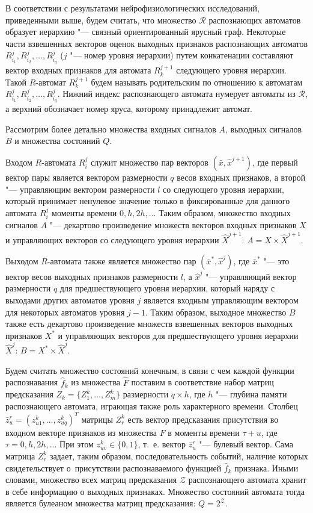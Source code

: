 \documentclass[a4paper, 12pt]{article}
\numberwithin{equation}{section}
\begin{document}
	В соответствии с результатами нейрофизиологических исследований, приведенными выше, будем считать, что множество  $\mathcal R$ распознающих автоматов образует иерархию "--- связный ориентированный ярусный граф. Некоторые части взвешенных векторов оценок выходных признаков распознающих автоматов $R_{i_1}^j,R_{i_2}^j,\dots,R_{i_q}^j$ ($j$ "--- номер уровня иерархии) путем конкатенации составляют вектор входных признаков для  автомата $R_k^{j+1}$ следующего уровня иерархии. Такой $R$-автомат $R_k^{j+1}$ будем называть родительским по отношению к автоматам $R_{i_1}^j,R_{i_2}^j,\dots,R_{i_q}^j$. Нижний индекс распознающего автомата нумерует автоматы из $\mathcal R$, а верхний обозначает номер яруса, которому принадлежит автомат.
		
	Рассмотрим более детально множества входных сигналов $A$, выходных сигналов $B$ и множества состояний $Q$.
	
	Входом $R$-автомата $R_i^j$ служит множество пар векторов $(\bar x,\hat x^{j+1})$, где первый вектор пары является вектором размерности $q$ весов входных признаков, а второй "--- управляющим вектором размерности $l$ со следующего уровня иерархии, который принимает ненулевое значение только в фиксированные для данного автомата $R_i^j$ моменты времени $0,h,2h,\dots$ Таким образом, множество входных сигналов $A$ "--- декартово произведение множеств векторов входных признаков $X$ и управляющих векторов со следующего уровня иерархии $\hat X^{j+1}$: $A=X\times \hat X^{j+1}$. 
	
	Выходом $R$-автомата также является множество пар $(\bar x^*,\hat x^j)$, где $\bar x^*$ "--- это вектор весов выходных признаков размерности $l$, а $\hat x^j$ "--- управляющий вектор размерности $q$ для предшествующего уровня иерархии, который наряду с выходами других автоматов уровня $j$ является входным управляющим вектором для некоторых автоматов уровня $j-1$. Таким образом, выходное множество $B$ также есть декартово произведение множеств взвешенных векторов выходных признаков $X^*$ и управляющих векторов для предшествующего уровня иерархии $\hat X^j$: $B=X^*\times \hat X^j$.
	
	Будем считать множество состояний конечным, в связи с чем каждой функции распознавания $\hat f_k$ из множества $\hat F$ поставим в соответствие набор матриц предсказания $Z_k=\{Z_1^k,…,Z_m^k\}$ размерности $q\times h$, где $h$ "--- глубина памяти распознающего автомата, играющая также роль характерного времени. Столбец $\bar{z}_u^r=(z_{u1}^k,…,z_{uq}^k)^T$ матрицы $Z_r^k$ есть вектор предсказания присутствия во входном векторе признаков из множества $F$ в моменты времени $\tau+u$, где $\tau = 0,h,2h,\dots$ При этом $z_{uv}^k\in\{0,1\}$, т.~е. вектор $\bar{z}_u^r$ "--- булевый вектор. Сама матрица $Z_r^k$ задает, таким образом, последовательность событий, наличие которых свидетельствует о~присутствии распознаваемого функцией $\hat f_k$ признака. Иными словами, множество всех матриц предсказания $\mathcal Z$ распознающего автомата хранит в себе информацию о выходных признаках. Множество состояний автомата тогда является булеаном множества матриц предсказания: $Q=2^{\mathcal Z}$.
	
\end{document}
